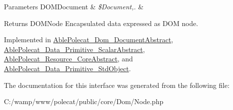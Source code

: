 \begin{DoxyParams}[1]{Parameters}
D\+O\+M\+Document & {\em \$\+Document,.} & \\
\hline
\end{DoxyParams}
\begin{DoxyReturn}{Returns}
D\+O\+M\+Node Encapsulated data expressed as D\+O\+M node. 
\end{DoxyReturn}


Implemented in \hyperlink{class_able_polecat___dom___document_abstract_a3241c66cb1cbb7b720be191808876012}{Able\+Polecat\+\_\+\+Dom\+\_\+\+Document\+Abstract}, \hyperlink{class_able_polecat___data___primitive___scalar_abstract_a3241c66cb1cbb7b720be191808876012}{Able\+Polecat\+\_\+\+Data\+\_\+\+Primitive\+\_\+\+Scalar\+Abstract}, \hyperlink{class_able_polecat___resource___core_abstract_a3241c66cb1cbb7b720be191808876012}{Able\+Polecat\+\_\+\+Resource\+\_\+\+Core\+Abstract}, and \hyperlink{class_able_polecat___data___primitive___std_object_a3241c66cb1cbb7b720be191808876012}{Able\+Polecat\+\_\+\+Data\+\_\+\+Primitive\+\_\+\+Std\+Object}.



The documentation for this interface was generated from the following file\+:\begin{DoxyCompactItemize}
\item 
C\+:/wamp/www/polecat/public/core/\+Dom/Node.\+php\end{DoxyCompactItemize}
